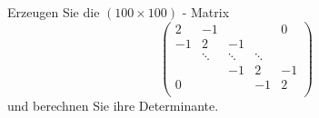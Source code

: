 \begin{aufg}[0]
\label{vander}
Erzeugen Sie die $(100 \times 100)$ - Matrix 
\[ \left( \begin{array} {ccccccc}
 2 & -1 &  & &   0 \\
-1 & 2  & -1 &    & \\ 
   & \ddots & \ddots & \ddots   &\\
   & &  -1 & 2  & -1  \\ 
0 &  &    & -1 & 2 \\
\end{array} \right) \]
und berechnen Sie ihre Determinante.
\end{aufg}